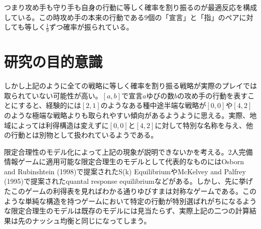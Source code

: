 \documentclass{jsarticle}
\begin{document}
つまり攻め手も守り手も自身の行動に等しく確率を割り振るのが最適反応を構成している。この時攻め手の本来の行動である$9$個の「宣言」と「指」のペアに対しても等しく$\frac{1}{9}$ずつ確率が振られている。

\section{研究の目的意識}
しかし上記のように全ての戦略に等しく確率を割り振る戦略が実際のプレイでは取られていない可能性が高い。$[a,b]$で宣言$a$ゆびの数$b$の攻め手の行動を表すことにすると、経験的には$[2,1]$のようなある種中途半端な戦略が$[0,0]$や$[4,2]$のような極端な戦略よりも取られやすい傾向があるようように思える。実際、地域によっては利得構造は変えずに$[0,0]$と$[4,2]$に対して特別な名称を与え、他の行動とは別物として扱われているようである。

限定合理性のモデル化によって上記の現象が説明できないかを考える。2人完備情報ゲームに適用可能な限定合理生のモデルとして代表的なものにはOsborn and Rubinshtein (1998)で提案されたS(k) EquilibriumやMcKelvey and Palfrey (1995)で提案されたquantal response equilibriumなどがある。しかし、先に挙げたこのゲームの利得表を見ればわかる通りゆびすまは対称なゲームである。このような単純な構造を持つゲームにおいて特定の行動が特別選ばれがちになるような限定合理生のモデルは既存のモデルには見当たらず、実際上記の二つの計算結果は先のナッシュ均衡と同じになってしまう。
\end{document}
